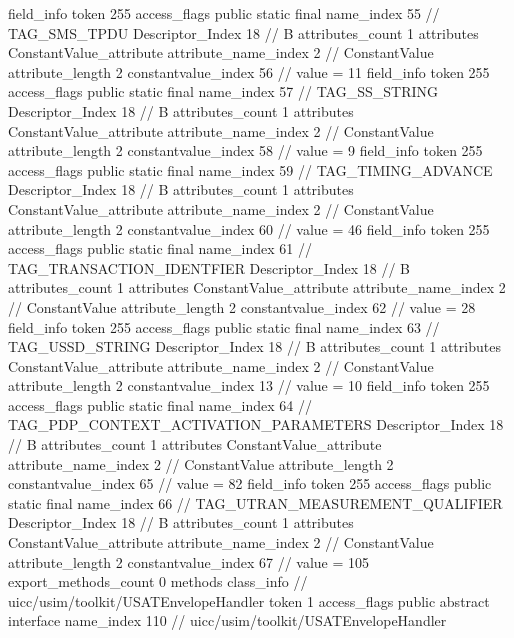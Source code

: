 {{{{{{{				}
				}
			}
			field_info {
				token	255
				access_flags	public static final
				name_index	55		// TAG_SMS_TPDU
				Descriptor_Index	18		// B
				attributes_count	1
				attributes {
				ConstantValue_attribute {
					attribute_name_index	2		// ConstantValue
					attribute_length	2
					constantvalue_index	56		// value = 11
				}
				}
			}
			field_info {
				token	255
				access_flags	public static final
				name_index	57		// TAG_SS_STRING
				Descriptor_Index	18		// B
				attributes_count	1
				attributes {
				ConstantValue_attribute {
					attribute_name_index	2		// ConstantValue
					attribute_length	2
					constantvalue_index	58		// value = 9
				}
				}
			}
			field_info {
				token	255
				access_flags	public static final
				name_index	59		// TAG_TIMING_ADVANCE
				Descriptor_Index	18		// B
				attributes_count	1
				attributes {
				ConstantValue_attribute {
					attribute_name_index	2		// ConstantValue
					attribute_length	2
					constantvalue_index	60		// value = 46
				}
				}
			}
			field_info {
				token	255
				access_flags	public static final
				name_index	61		// TAG_TRANSACTION_IDENTFIER
				Descriptor_Index	18		// B
				attributes_count	1
				attributes {
				ConstantValue_attribute {
					attribute_name_index	2		// ConstantValue
					attribute_length	2
					constantvalue_index	62		// value = 28
				}
				}
			}
			field_info {
				token	255
				access_flags	public static final
				name_index	63		// TAG_USSD_STRING
				Descriptor_Index	18		// B
				attributes_count	1
				attributes {
				ConstantValue_attribute {
					attribute_name_index	2		// ConstantValue
					attribute_length	2
					constantvalue_index	13		// value = 10
				}
				}
			}
			field_info {
				token	255
				access_flags	public static final
				name_index	64		// TAG_PDP_CONTEXT_ACTIVATION_PARAMETERS
				Descriptor_Index	18		// B
				attributes_count	1
				attributes {
				ConstantValue_attribute {
					attribute_name_index	2		// ConstantValue
					attribute_length	2
					constantvalue_index	65		// value = 82
				}
				}
			}
			field_info {
				token	255
				access_flags	public static final
				name_index	66		// TAG_UTRAN_MEASUREMENT_QUALIFIER
				Descriptor_Index	18		// B
				attributes_count	1
				attributes {
				ConstantValue_attribute {
					attribute_name_index	2		// ConstantValue
					attribute_length	2
					constantvalue_index	67		// value = 105
				}
				}
			}
			}
			export_methods_count	0
			methods {
			}
		}
		class_info {		// uicc/usim/toolkit/USATEnvelopeHandler
			token	1
			access_flags	public abstract interface
			name_index	110		// uicc/usim/toolkit/USATEnvelopeHandler
}}}
